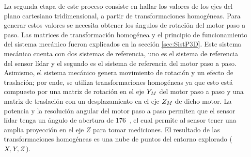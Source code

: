 La segunda etapa de este proceso consiste en hallar los valores de los ejes del plano cartesiano 
tridimensional, a partir de transformaciones homogéneas. Para generar estos 
valores se necesita obtener los ángulos de rotación del motor paso a paso. Las matrices
de transformación homogénea y el principio de funcionamiento del sistema mecánico fueron
explicados en la sección \ref{sec:SistP3D}. Este sistema mecánico cuenta con dos sistemas
de referencia, uno es el sistema de referencia del sensor lídar y el segundo es el sistema
de referencia del motor paso a paso. Asimismo, el sistema mecánico genera movimiento de 
rotación y un efecto de traslación; por ende, se utiliza transformaciones homogéneas ya que esto 
está compuesto por una matriz de rotación en el eje $\mathnormal Y_{M}$ del motor paso a paso y
una matriz de traslación con un desplazamiento en el eje $\mathnormal Z_{M}$ de dicho motor. La potencia
y la resolución angular del motor paso a paso permiten que el sensor lídar tenga un ángulo de 
abertura de 176\grad~, el cual permite al sensor tener una amplia proyección en el eje $Z$ para
tomar mediciones. El resultado de las transformaciones homogéneas es una nube de puntos del
entorno explorado ($\mathnormal X, \mathnormal Y, \mathnormal Z$).


